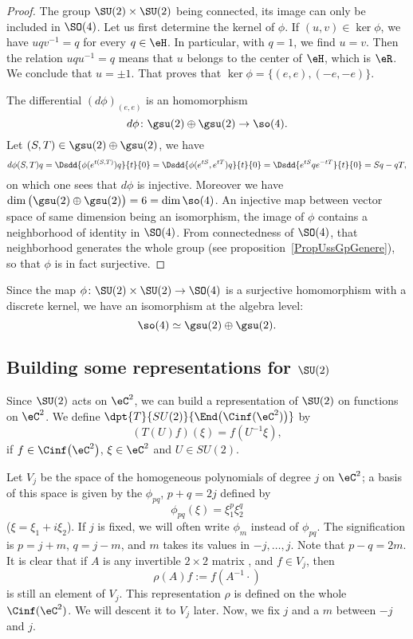 \begin{proof}
The group $\SU(2)\times \SU(2)$ being connected, its image can only be included in $\SO(4)$. Let us first determine the kernel of $\phi$. If $(u,v)\in\ker\phi$, we have $uqv^{-1}=q$ for every $q\in\eH$. In particular, with $q=1$, we find $u=v$. Then the relation $uqu^{-1}=q$ means that $u$ belongs to the center of $\eH$, which is $\eR$. We conclude that $u=\pm 1$. That proves that $\ker\phi=\big\{  (e,e),(-e,-e) \big\}$.

The differential $(d\phi)_{(e,e)}$ is an homomorphism
\[
	d\phi\colon \gsu(2)\oplus\gsu(2)\to \so(4).
\]
Let $(S,T)\in\gsu(2)\oplus\gsu(2)$, we have
\[
	d\phi(S,T)q=\Dsdd{ \phi( e^{t(S,T)})q }{t}{0}=\Dsdd{ \phi( e^{tS}, e^{tT})q }{t}{0}=\Dsdd{  e^{tS}q e^{-tT} }{t}{0}=Sq-qT,
\]
on which one sees that $d\phi$ is injective. Moreover we have $\dim\big( \gsu(2)\oplus\gsu(2) \big)=6=\dim\so(4)$. An injective map between vector space of same dimension being an isomorphism, the image of $\phi$ contains a neighborhood of identity in $\SO(4)$. From connectedness of $\SO(4)$, that neighborhood generates the whole group (see proposition~\ref{PropUssGpGenere}), so that $\phi$ is in fact surjective.
\end{proof}

Since the map $\phi\colon \SU(2)\times \SU(2)\to \SO(4)$ is a surjective homomorphism with a discrete kernel, we have an isomorphism at the algebra level:
\[
	\so(4)\simeq \gsu(2)\oplus\gsu(2).
\]

\subsection{Building some representations for \texorpdfstring{$\SU(2)$}{SU2}}

Since $\SU(2)$ acts on $\eC^2$, we can build a representation of $\SU(2)$ on functions on $\eC^2$. We define $\dpt{T}{SU(2)}{\End\big(\Cinf(\eC^2)\big)}$ by
\[
  (T(U)f)(\xi)=f(U^{-1}\xi),
\]
if $f\in\Cinf\big(\eC^2\big)$, $\xi\in\eC^2$ and $U\in SU(2)$.

Let $V_j$ be the space of the homogeneous polynomials of degree $j$ on $\eC^2$; a basis of this space is given by the $\phi_{pq}$, $p+q=2j$ defined by
\begin{equation}
   \phi_{pq}(\xi)=\xi_1^p\xi_2^q
\end{equation}
($\xi=\xi_1+i\xi_2$). If $j$ is fixed, we will often write $\phi_m$ instead of $\phi_{pq}$. The signification is $p=j+m$, $q=j-m$, and $m$ takes its values in $-j,\ldots,j$. Note that $p-q=2m$. It is clear that if $A$ is any invertible $2\times 2$ matrix , and $f\in V_j$, then
\[
   \rho(A)f:=f(A^{-1} \cdot)
\]
 is still an element of $V_j$. This representation $\rho$ is defined on the whole $\Cinf(\eC^2)$. We will descent it to $V_j$ later.
Now, we fix $j$ and a $m$ between $-j$ and $j$.

